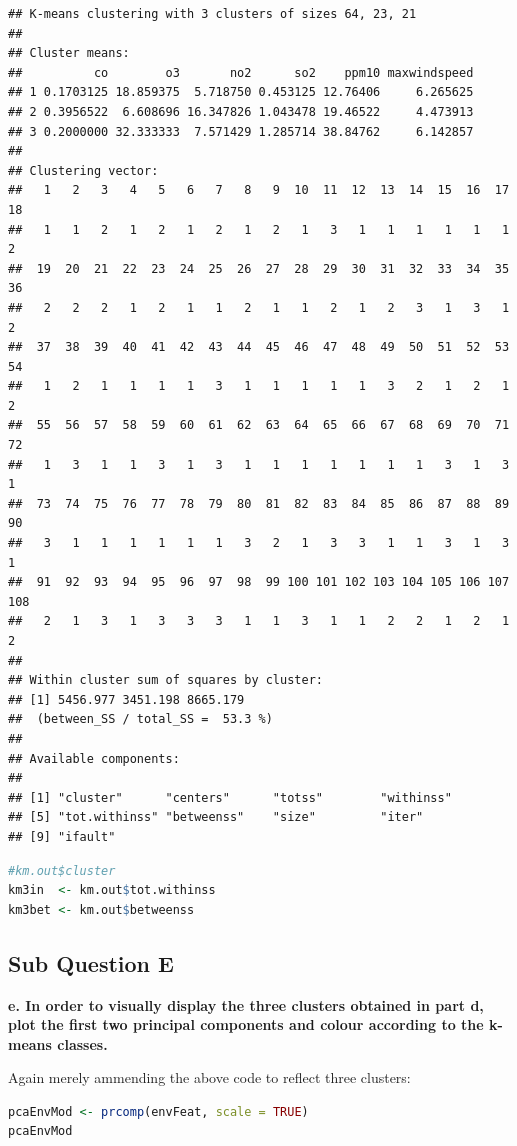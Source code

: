 \documentclass[
]{article}
\begin{document}
\begin{lstlisting}
## K-means clustering with 3 clusters of sizes 64, 23, 21
## 
## Cluster means:
##          co        o3       no2      so2    ppm10 maxwindspeed
## 1 0.1703125 18.859375  5.718750 0.453125 12.76406     6.265625
## 2 0.3956522  6.608696 16.347826 1.043478 19.46522     4.473913
## 3 0.2000000 32.333333  7.571429 1.285714 38.84762     6.142857
## 
## Clustering vector:
##   1   2   3   4   5   6   7   8   9  10  11  12  13  14  15  16  17  18 
##   1   1   2   1   2   1   2   1   2   1   3   1   1   1   1   1   1   2 
##  19  20  21  22  23  24  25  26  27  28  29  30  31  32  33  34  35  36 
##   2   2   2   1   2   1   1   2   1   1   2   1   2   3   1   3   1   2 
##  37  38  39  40  41  42  43  44  45  46  47  48  49  50  51  52  53  54 
##   1   2   1   1   1   1   3   1   1   1   1   1   3   2   1   2   1   2 
##  55  56  57  58  59  60  61  62  63  64  65  66  67  68  69  70  71  72 
##   1   3   1   1   3   1   3   1   1   1   1   1   1   1   3   1   3   1 
##  73  74  75  76  77  78  79  80  81  82  83  84  85  86  87  88  89  90 
##   3   1   1   1   1   1   1   3   2   1   3   3   1   1   3   1   3   1 
##  91  92  93  94  95  96  97  98  99 100 101 102 103 104 105 106 107 108 
##   2   1   3   1   3   3   3   1   1   3   1   1   2   2   1   2   1   2 
## 
## Within cluster sum of squares by cluster:
## [1] 5456.977 3451.198 8665.179
##  (between_SS / total_SS =  53.3 %)
## 
## Available components:
## 
## [1] "cluster"      "centers"      "totss"        "withinss"    
## [5] "tot.withinss" "betweenss"    "size"         "iter"        
## [9] "ifault"
\end{lstlisting}

\begin{lstlisting}[language=R]
#km.out$cluster
km3in  <- km.out$tot.withinss
km3bet <- km.out$betweenss
\end{lstlisting}

\hypertarget{sub-question-e}{%
\subsection{Sub Question E}\label{sub-question-e}}

\textbf{e. In order to visually display the three clusters obtained in
part d, plot the first two principal components and colour according to
the k-means classes.}

Again merely ammending the above code to reflect three clusters:

\begin{lstlisting}[language=R]
pcaEnvMod <- prcomp(envFeat, scale = TRUE)
pcaEnvMod
\end{lstlisting}
\end{document}
